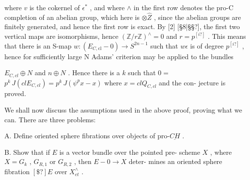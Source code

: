 \documentclass[11pt]{article}
\newcommand{\scanpage}[1]{\par\bigskip\noindent{\small\sffamily[scan #1]}\par}
\newcommand{\mspage}[1]{{\small\sffamily[p.\,#1]}}
\newcommand{\hand}[1]{\textcolor{blue}{#1}}
\newcommand{\unsure}[1]{[#1?]}
\newenvironment{diagramblock}{\par\begin{center}}{\end{center}\par}
\begin{document}
\begin{diagramblock}
\end{diagramblock}

where  $v$  is the cokernel of  $\epsilon^*$ , and where  $\wedge$  in the first row
denotes the pro-C completion of an abelian group, which here is  $\otimes\hat{Z}$ ,
since the abelian groups are finitely generated, and hence the first
row is exact.  By [2] \unsure{§8|§§}, the first two vertical maps are isomorphisms,
hence  $(\mathbb{Z}/r\mathbb{Z})^{\wedge} = 0$  and  $r = p^{\unsure{i}}$ .  This means that there is an S-map
$w:(E_{C,\mathrm{cl}} - 0) \to S^{2n-1}$  such that  $w\epsilon$  is of degree $p^{\unsure{i}}$ , hence for
sufficiently large  N  Adams' criterion may be applied to the bundles

\mspage{\hand{61}}

\clearpage
\scanpage{162-5/62}
\mspage{- 6 -}

$E_{C,cl} \oplus N$ and $n \oplus N$ . Hence there is a $k$ such that $0 =$
$p^{k}\, J(clE_{C,cl}) = p^{k}\, J(\psi^{p}x - x)$ where $x = clQ_{C,cl}$ and the con-%
jecture is proved.

We shall now discuss the assumptions used in the above proof,
proving what we can. There are three problems:

A. Define oriented sphere fibrations over objects of pro-$\underline{CH}$ .

B. Show that if $E$ is a vector bundle over the pointed pre-%
scheme $X$ , where $X = G_{k}$ , $G_{R,1}$ or $G_{R,2}$ , then $E - 0 \to X$ deter-%
mines an oriented sphere fibration $\unsure{\$}E$ over $X^{\wedge}_{et}$ .
\end{document}
